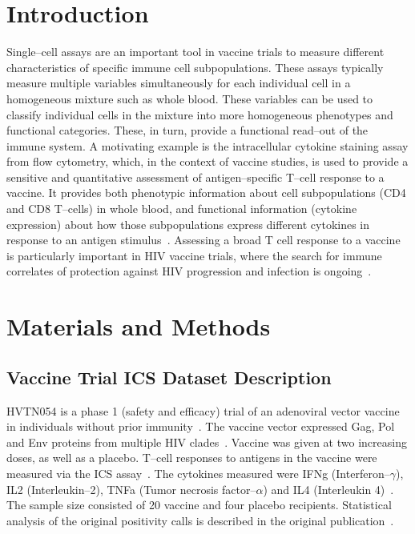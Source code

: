 \documentclass[11pt]{article}
\begin{document}
\section{Introduction}
Single--cell assays are an important tool in vaccine trials to measure different characteristics of specific immune cell subpopulations. These assays typically measure multiple variables simultaneously for each individual cell in a homogeneous mixture such as whole blood. These variables can be used to classify individual cells in the mixture into more homogeneous phenotypes and functional categories. These, in turn, provide a functional read--out of the immune system. A motivating example is the intracellular cytokine staining assay from flow cytometry, which, in the context of vaccine studies, is used to provide a sensitive and quantitative assessment of antigen--specific T--cell response to a vaccine. It provides both phenotypic information about cell subpopulations (CD4 and CD8 T--cells) in whole blood, and functional information (cytokine expression) about how those subpopulations express different cytokines in response to an antigen stimulus~\cite{Horton:2007tsa,DeRosa:2004wp,Betts:2006dw}. Assessing a broad T cell response to a vaccine is particularly important in HIV vaccine trials, where the search for immune correlates of protection against HIV progression and infection is ongoing~\cite{Plotkin:2010ve,Horton:2007tsa,Kim:2010fw}.


\section{Materials and Methods}
\subsection{Vaccine Trial ICS Dataset Description}
HVTN054 is a phase 1 (safety and efficacy) trial of an adenoviral vector vaccine in individuals without prior immunity~\cite{Peiperl:2010ej}. The vaccine vector expressed Gag, Pol and Env proteins from multiple HIV clades~\cite{Peiperl:2010ej}. Vaccine was given at two increasing doses, as well as a placebo. T--cell responses to antigens in the vaccine were measured via the ICS assay~\cite{Peiperl:2010ej,Horton:2007tsa}. The cytokines measured were IFNg (Interferon--$\gamma$), IL2 (Interleukin--2), TNFa (Tumor necrosis factor--$\alpha$) and IL4 (Interleukin 4)~\cite{Horton:2007tsa}. The sample size consisted of 20 vaccine and four placebo recipients. Statistical analysis of the original positivity calls is described in the original publication~\cite{Peiperl:2010ej}.
 
\end{document}
